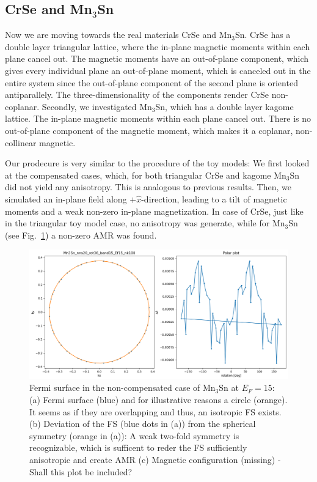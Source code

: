 \documentclass[prb,showpacs,amsmath,amssymb,superscriptaddress,twocolumn,floatfix]{revtex4-1}
\begin{document}
\subsection{CrSe and Mn$_3$Sn}
\label{sec_I_mat}

Now we are moving towards the real materials CrSe and Mn$_3$Sn. CrSe has a double layer triangular lattice, where the in-plane magnetic moments within each plane cancel out. The magnetic moments have an out-of-plane component, which gives every individual plane an out-of-plane moment, which is canceled out in the entire system since the out-of-plane component of the second plane is oriented antiparallely. The three-dimensionality of the components render CrSe non-coplanar. Secondly, we investigated Mn$_3$Sn, which has a double layer kagome lattice. The in-plane magnetic moments within each plane cancel out. There is no out-of-plane component of the magnetic moment, which makes it a coplanar, non-collinear magnetic.

Our prodecure is very similar to the procedure of the toy models: We first looked at the compensated cases, which, for both triangular CrSe and kagome Mn$_3$Sn did not yield any anisotropy. This is analogous to previous results. Then, we simulated an in-plane field along $+\hat{x}$-direction, leading to a tilt of magnetic moments and a weak non-zero in-plane magnetization. In case of CrSe, just like in the triangular toy model case, no anisotropy was generate, while for Mn$_3$Sn (see Fig.~\ref{fig:mn3sn_36deg_FS}) a non-zero AMR was found.

\begin{figure}
	\centering
	\includegraphics[width=\linewidth]{img/Mn3Sn_nns20_rot36_band15_Ef15_nk100}
	\caption{Fermi surface in the non-compensated case of Mn$_3$Sn at $E_F = 15$: (a) Fermi surface (blue) and for illustrative reasons a circle (orange). It seems as if they are overlapping and thus, an isotropic FS exists. (b) Deviation of the FS (blue dots in (a)) from the spherical symmetry (orange in (a)): A weak two-fold symmetry is recognizable, which is sufficent to reder the FS sufficiently anisotropic and create AMR {\color{red} (c) Magnetic configuration (missing) - Shall this plot be included?}}
	\label{fig:mn3sn_36deg_FS}
\end{figure}
\end{document}
